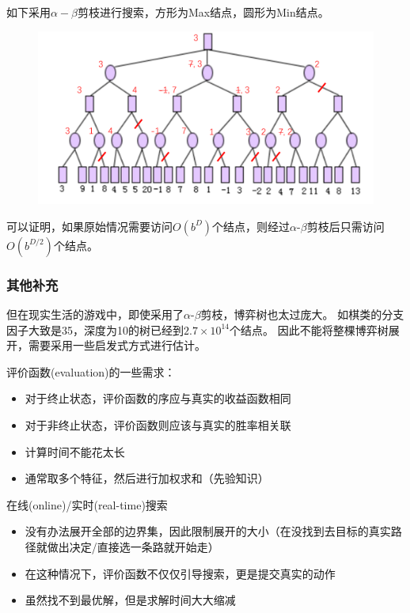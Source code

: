 \begin{example}
如下采用$\alpha-\beta$剪枝进行搜索，方形为Max结点，圆形为Min结点。
\begin{figure}[H]
\centering
\includegraphics[width=0.9\linewidth]{fig/T01-3.png}
\end{figure}
\end{example}

可以证明，如果原始情况需要访问$O(b^D)$个结点，则经过$\alpha$-$\beta$剪枝后只需访问$O(b^{D/2})$个结点。

\subsubsection{其他补充}
但在现实生活的游戏中，即使采用了$\alpha$-$\beta$剪枝，博弈树也太过庞大。
如棋类的分支因子大致是35，深度为10的树已经到$2.7\times 10^{14}$个结点。
因此不能将整棵博弈树展开，需要采用一些启发式方式进行估计。

评价函数(evaluation)的一些需求：
\begin{itemize}
	\item 对于终止状态，评价函数的序应与真实的收益函数相同
	\item 对于非终止状态，评价函数则应该与真实的胜率相关联
	\item 计算时间不能花太长
	\item 通常取多个特征，然后进行加权求和（先验知识）
\end{itemize}

在线(online)/实时(real-time)搜索
\begin{itemize}
	\item 没有办法展开全部的边界集，因此限制展开的大小（在没找到去目标的真实路径就做出决定/直接选一条路就开始走）
	\item 在这种情况下，评价函数不仅仅引导搜索，更是提交真实的动作
	\item 虽然找不到最优解，但是求解时间大大缩减
\end{itemize}
